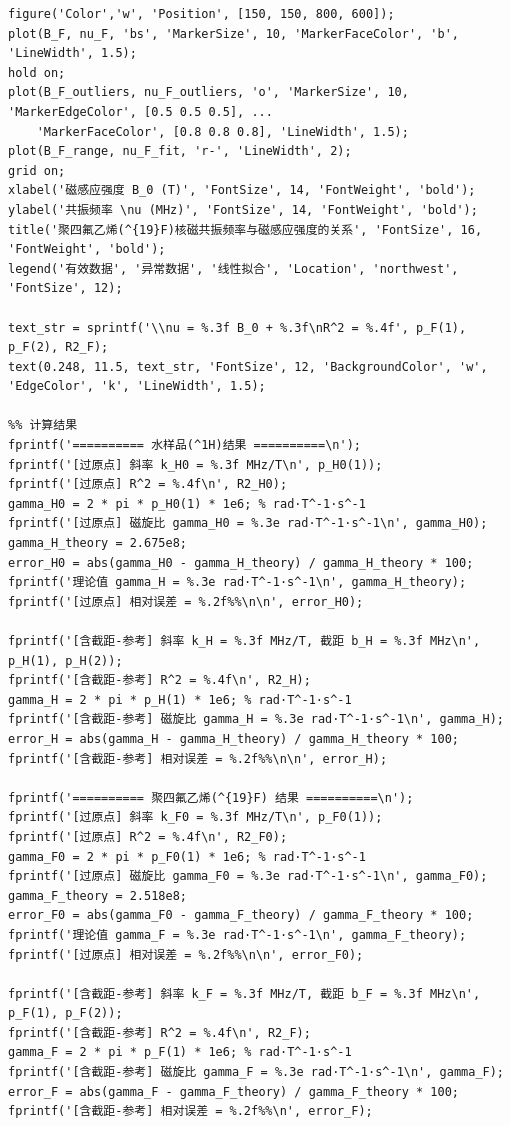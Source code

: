 ﻿\documentclass[12pt,a4paper]{article}
\begin{document}
\begin{lstlisting}[style=Matlab-boxed,caption={核磁共振数据处理代码}]
%% 绘图：聚四氟乙烯样品
figure('Color','w', 'Position', [150, 150, 800, 600]);
plot(B_F, nu_F, 'bs', 'MarkerSize', 10, 'MarkerFaceColor', 'b', 'LineWidth', 1.5); 
hold on;
plot(B_F_outliers, nu_F_outliers, 'o', 'MarkerSize', 10, 'MarkerEdgeColor', [0.5 0.5 0.5], ...
    'MarkerFaceColor', [0.8 0.8 0.8], 'LineWidth', 1.5);
plot(B_F_range, nu_F_fit, 'r-', 'LineWidth', 2);
grid on;
xlabel('磁感应强度 B_0 (T)', 'FontSize', 14, 'FontWeight', 'bold');
ylabel('共振频率 \nu (MHz)', 'FontSize', 14, 'FontWeight', 'bold');
title('聚四氟乙烯(^{19}F)核磁共振频率与磁感应强度的关系', 'FontSize', 16, 'FontWeight', 'bold');
legend('有效数据', '异常数据', '线性拟合', 'Location', 'northwest', 'FontSize', 12);

text_str = sprintf('\\nu = %.3f B_0 + %.3f\nR^2 = %.4f', p_F(1), p_F(2), R2_F);
text(0.248, 11.5, text_str, 'FontSize', 12, 'BackgroundColor', 'w', 'EdgeColor', 'k', 'LineWidth', 1.5);

%% 计算结果
fprintf('========== 水样品(^1H)结果 ==========\n');
fprintf('[过原点] 斜率 k_H0 = %.3f MHz/T\n', p_H0(1));
fprintf('[过原点] R^2 = %.4f\n', R2_H0);
gamma_H0 = 2 * pi * p_H0(1) * 1e6; % rad·T^-1·s^-1
fprintf('[过原点] 磁旋比 gamma_H0 = %.3e rad·T^-1·s^-1\n', gamma_H0);
gamma_H_theory = 2.675e8;
error_H0 = abs(gamma_H0 - gamma_H_theory) / gamma_H_theory * 100;
fprintf('理论值 gamma_H = %.3e rad·T^-1·s^-1\n', gamma_H_theory);
fprintf('[过原点] 相对误差 = %.2f%%\n\n', error_H0);

fprintf('[含截距-参考] 斜率 k_H = %.3f MHz/T, 截距 b_H = %.3f MHz\n', p_H(1), p_H(2));
fprintf('[含截距-参考] R^2 = %.4f\n', R2_H);
gamma_H = 2 * pi * p_H(1) * 1e6; % rad·T^-1·s^-1
fprintf('[含截距-参考] 磁旋比 gamma_H = %.3e rad·T^-1·s^-1\n', gamma_H);
error_H = abs(gamma_H - gamma_H_theory) / gamma_H_theory * 100;
fprintf('[含截距-参考] 相对误差 = %.2f%%\n\n', error_H);

fprintf('========== 聚四氟乙烯(^{19}F) 结果 ==========\n');
fprintf('[过原点] 斜率 k_F0 = %.3f MHz/T\n', p_F0(1));
fprintf('[过原点] R^2 = %.4f\n', R2_F0);
gamma_F0 = 2 * pi * p_F0(1) * 1e6; % rad·T^-1·s^-1
fprintf('[过原点] 磁旋比 gamma_F0 = %.3e rad·T^-1·s^-1\n', gamma_F0);
gamma_F_theory = 2.518e8;
error_F0 = abs(gamma_F0 - gamma_F_theory) / gamma_F_theory * 100;
fprintf('理论值 gamma_F = %.3e rad·T^-1·s^-1\n', gamma_F_theory);
fprintf('[过原点] 相对误差 = %.2f%%\n\n', error_F0);

fprintf('[含截距-参考] 斜率 k_F = %.3f MHz/T, 截距 b_F = %.3f MHz\n', p_F(1), p_F(2));
fprintf('[含截距-参考] R^2 = %.4f\n', R2_F);
gamma_F = 2 * pi * p_F(1) * 1e6; % rad·T^-1·s^-1
fprintf('[含截距-参考] 磁旋比 gamma_F = %.3e rad·T^-1·s^-1\n', gamma_F);
error_F = abs(gamma_F - gamma_F_theory) / gamma_F_theory * 100;
fprintf('[含截距-参考] 相对误差 = %.2f%%\n', error_F);
\end{lstlisting}
\end{document}
